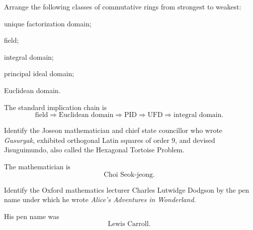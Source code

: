     \begin{expectedproblem}
        Arrange the following classes of commutative rings from strongest to
        weakest:
        \begin{problemchoices}
            \item unique factorization domain;
            \item field;
            \item integral domain;
            \item principal ideal domain;
            \item Euclidean domain.
        \end{problemchoices}
    \end{expectedproblem}

    \begin{solution}
        The standard implication chain is
        \[
            \boxed{
                \text{field}
                \Longrightarrow
                \text{Euclidean domain}
                \Longrightarrow
                \text{PID}
                \Longrightarrow
                \text{UFD}
                \Longrightarrow
                \text{integral domain}
            }.
        \]
    \end{solution}

    \begin{expectedproblem}
        Identify the Joseon mathematician and chief state councillor who wrote
        \textit{Gusuryak}, exhibited orthogonal Latin squares of order $9$, and
        devised Jisuguimundo, also called the Hexagonal Tortoise Problem.
    \end{expectedproblem}

    \begin{solution}
        The mathematician is
        \[
            \boxed{\text{Choi Seok-jeong}}.
        \]
    \end{solution}

    \begin{expectedproblem}
        Identify the Oxford mathematics lecturer Charles Lutwidge Dodgson by the
        pen name under which he wrote
        \textit{Alice's Adventures in Wonderland}.
    \end{expectedproblem}

    \begin{solution}
        His pen name was
        \[
            \boxed{\text{Lewis Carroll}}.
        \]
    \end{solution}

